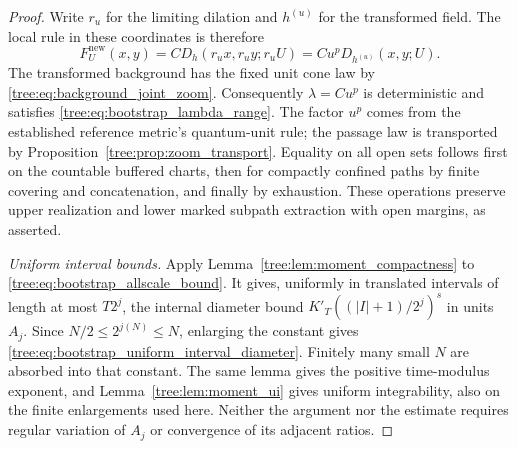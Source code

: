 \begin{proof}
Write $r_u$ for the limiting dilation and $h^{(u)}$ for the
transformed field. The local rule in these coordinates is
therefore
\[
 F^{\mathrm{new}}_U(x,y)
   =C D_h(r_ux,r_uy;r_uU)
   =Cu^pD_{h^{(u)}}(x,y;U).
\]
The transformed background has the fixed unit cone law by
\eqref{tree:eq:background_joint_zoom}. Consequently
$\lambda=Cu^p$ is deterministic and satisfies
\eqref{tree:eq:bootstrap_lambda_range}. The factor $u^p$ comes
from the established reference metric's quantum-unit rule;
the passage law is transported by
Proposition~\ref{tree:prop:zoom_transport}.
Equality on all open sets follows first on the countable
buffered charts, then for compactly confined paths by finite
covering and concatenation, and finally by exhaustion.
These operations preserve upper realization and lower marked
subpath extraction with open margins, as asserted.

\smallskip\noindent\emph{Uniform interval bounds.}
Apply Lemma~\ref{tree:lem:moment_compactness} to
\eqref{tree:eq:bootstrap_allscale_bound}.  It gives,
uniformly in translated intervals of length at
most $T2^j$, the internal diameter bound
$K'_T((|I|+1)/2^j)^s$ in units $A_j$.
Since $N/2\leq2^{j(N)}\leq N$, enlarging the
constant gives
\eqref{tree:eq:bootstrap_uniform_interval_diameter}.
Finitely many small $N$ are absorbed into that
constant.  The same lemma gives the positive
time-modulus exponent, and
Lemma~\ref{tree:lem:moment_ui} gives uniform
integrability, also on the finite enlargements
used here.  Neither the argument nor the estimate
requires regular variation of $A_j$ or convergence
of its adjacent ratios.
\end{proof}
